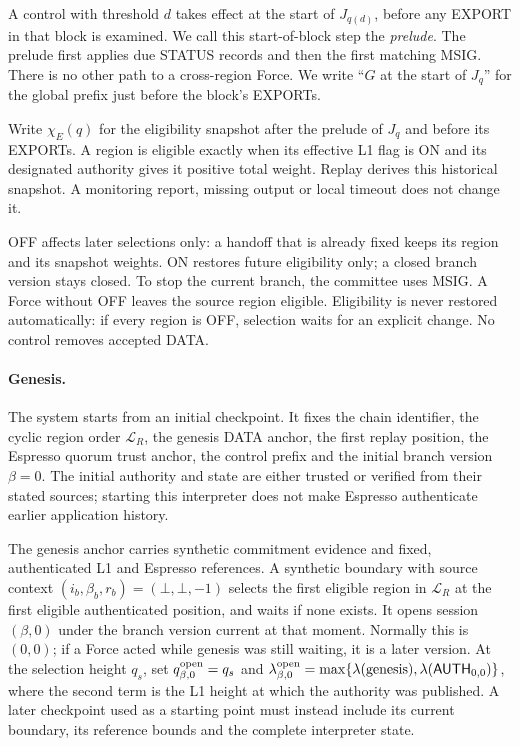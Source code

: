 \documentclass[11pt,a4paper]{article}
\newcommand{\tagg}[1]{\ensuremath{\mathsf{#1}}}
\newcommand{\defterm}[1]{\textcolor{rrBlue}{\textit{#1}}}
\begin{document}
A control with threshold $d$ takes effect at the start of $J_{q(d)}$,
before any EXPORT in that block is examined. We call this start-of-block
step the \defterm{prelude}. The prelude first applies due STATUS
records and then the first matching MSIG. There is no other path to a
cross-region Force. We write ``$G$ at the start of $J_q$'' for the global
prefix just before the block's EXPORTs.

Write $\chi_E(q)$ for the eligibility snapshot after the prelude of
$J_q$ and before its EXPORTs. A region is eligible exactly when its
effective L1 flag is ON and its designated authority gives it positive
total weight. Replay derives this historical snapshot. A monitoring
report, missing output or local timeout does not change it.

OFF affects later selections only: a handoff that is already fixed
keeps its region and its snapshot weights. ON restores future
eligibility only; a closed branch version stays closed. To stop
the current branch, the committee uses MSIG. A Force without OFF leaves
the source region eligible. Eligibility is never restored automatically:
if every region is OFF, selection waits for an explicit change. No
control removes accepted DATA.

\paragraph{Genesis.}
The system starts from an initial checkpoint. It fixes the chain
identifier, the cyclic region order $\mathcal L_R$, the genesis DATA
anchor, the first replay position, the Espresso quorum trust anchor,
the control prefix and the initial branch version $\beta=0$. The initial
authority and state are either trusted or verified from their stated
sources; starting this interpreter does not make Espresso authenticate
earlier application history.

The genesis anchor carries synthetic commitment evidence and fixed,
authenticated L1 and Espresso references. A synthetic boundary with
source context $(i_b,\beta_b,r_b)=(\bot,\bot,-1)$ selects the first
eligible region in $\mathcal L_R$ at the first eligible authenticated
position, and waits if none exists. It opens session $(\beta,0)$ under
the branch version current at that moment. Normally this is $(0,0)$; if
a Force acted while genesis was still waiting, it is a later version.
At the selection height $q_s$, set $q^{\rm open}_{\beta,0}=q_s$ and
$\lambda^{\rm open}_{\beta,0}=\max\{\lambda(\text{genesis}),
\lambda(\tagg{AUTH}_{0,0})\}$, where the second term is the L1 height
at which the authority was published. A later checkpoint used as a
starting point must instead include its current boundary, its reference
bounds and the complete interpreter state.
\end{document}
